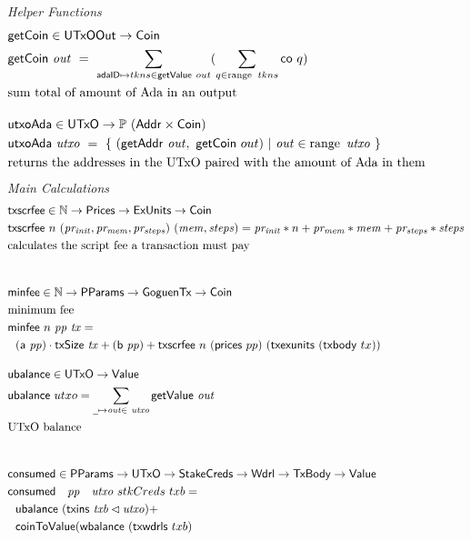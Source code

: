 \begin{figure}[htb]
  \emph{Helper Functions}
  \begin{align*}
    & \fun{getCoin} \in \UTxOOut \to \Coin \\
    & \fun{getCoin}~{\var{out}} ~=~\sum_{\mathsf{adaID} \mapsto tkns \in \fun{getValue}~out}
       (\sum_{q \in \range~{tkns}} \fun{co}~q) \\
    & \text{sum total of amount of Ada in an output}
    \nextdef
    & \fun{utxoAda} \in \UTxO \to \powerset{(\Addr \times \Coin)} \\
    & \fun{utxoAda}~{\var{utxo}} ~=~\{~(\fun{getAddr}~\var{out},~\fun{getCoin}~{out})
    ~\vert~ \var{out} \in \range~\var{utxo} ~\} \\
    & \text{returns the addresses in the UTxO paired with the amount of Ada in them} \\
  \end{align*}
  \emph{Main Calculations}
  \begin{align*}
    & \fun{txscrfee} \in \N \to \Prices \to \ExUnits \to \Coin \\
    & \fun{txscrfee}~n~ (\var{pr_{init}, pr_{mem}, pr_{steps}})~ (\var{mem, steps})
    = \var{pr_{init}}*n + \var{pr_{mem}}*\var{mem} + \var{pr_{steps}}*\var{steps} \\
    & \text{calculates the script fee a transaction must pay} \\
    \nextdef
    &\fun{minfee} \in \N \to \PParams \to \GoguenTx \to \Coin \\
    & \text{minimum fee}\\
    &\fun{minfee}  ~n~\var{pp}~\var{tx} = \\
    &~~(\fun{a}~\var{pp}) \cdot \fun{txSize}~\var{tx} + (\fun{b}~\var{pp}) +
    \fun{txscrfee}~n~(\fun{prices}~{pp})~(\fun{txexunits}~(\fun{txbody}~{tx}))
    \nextdef
    & \fun{ubalance} \in \UTxO \to \Value \\
    & \fun{ubalance} ~ utxo = \sum_{\wcard\mapsto\var{out}\in~\var{utxo}}
    \fun{getValue}~\var{out} \\
    & \text{UTxO balance} \\
    \nextdef
    & \fun{consumed} \in \PParams \to \UTxO \to \StakeCreds \to \Wdrl \to \TxBody \to \Value \\
    & \consumed~{pp}~{utxo}~{stkCreds}~{txb} = \\
    & ~~\ubalance{(\txins{txb} \restrictdom \var{utxo})} + \\
    &~~  \fun{coinToValue}(\fun{wbalance}~(\fun{txwdrls}~{txb})~\\

\end{align*}
\end{figure}
